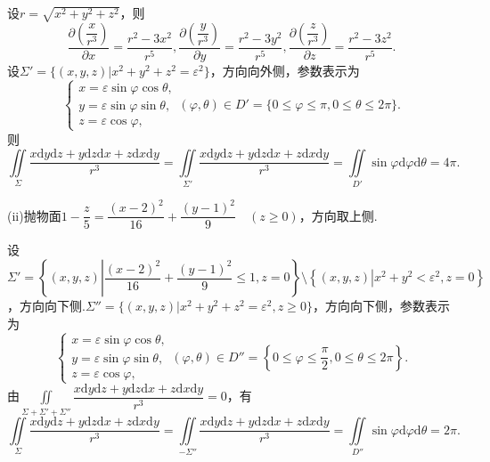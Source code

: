 \documentclass[12pt, a4paper]{article}
\newcommand{\dif}{\mathrm{d}}
\begin{document}
设\(r = \sqrt{x^2 + y^2 + z^2}\)，则
\[\frac{\partial\left(\dfrac{x}{r^3}\right)}{\partial x} = \frac{r^2 - 3x^2}{r^5}, \frac{\partial\left(\dfrac{y}{r^3}\right)}{\partial y} = \frac{r^2 - 3y^2}{r^5}, \frac{\partial\left(\dfrac{z}{r^3}\right)}{\partial z} = \frac{r^2 - 3z^2}{r^5}.\]
设\(\Sigma' = \{(x, y, z)|x^2 + y^2 + z^2 = \varepsilon^2\}\)，方向向外侧，参数表示为
\[\begin{cases}
x = \varepsilon\sin\varphi\cos\theta, \\
y = \varepsilon\sin\varphi\sin\theta, \\
z = \varepsilon\cos\varphi,
\end{cases} (\varphi, \theta) \in D' = \{0 \leq \varphi \leq \pi, 0 \leq \theta \leq 2\pi\}.\]
则
\[\iint\limits_{\Sigma} \frac{x \dif y \dif z + y \dif z \dif x + z \dif x \dif y}{r^3} = \iint\limits_{\Sigma'} \frac{x \dif y \dif z + y \dif z \dif x + z \dif x \dif y}{r^3} = \iint\limits_{D'} \sin\varphi \dif \varphi \dif \theta = 4\pi.\]

(ii)抛物面\(1 - \dfrac{z}{5} = \dfrac{(x - 2)^2}{16} + \dfrac{(y - 1)^2}{9} \quad (z \geq 0)\)，方向取上侧.

设\(\Sigma' = \left\{(x, y, z)\left|\dfrac{(x - 2)^2}{16} + \dfrac{(y - 1)^2}{9} \leq 1, z = 0\right.\right\} \setminus \left\{(x, y, z)\left|x^2 + y^2 < \varepsilon^2, z = 0\right.\right\}\)，方向向下侧.\(\Sigma'' = \{(x, y, z)|x^2 + y^2 + z^2 = \varepsilon^2, z \geq 0\}\)，方向向下侧，参数表示为
\[\begin{cases}
x = \varepsilon\sin\varphi\cos\theta, \\
y = \varepsilon\sin\varphi\sin\theta, \\
z = \varepsilon\cos\varphi,
\end{cases} (\varphi, \theta) \in D'' = \left\{0 \leq \varphi \leq \dfrac{\pi}{2}, 0 \leq \theta \leq 2\pi\right\}.\]
由\(\iint\limits_{\Sigma + \Sigma' + \Sigma''} \dfrac{x \dif y \dif z + y \dif z \dif x + z \dif x \dif y}{r^3} = 0\)，有
\[\iint\limits_\Sigma \dfrac{x \dif y \dif z + y \dif z \dif x + z \dif x \dif y}{r^3} = \iint\limits_{-\Sigma''} \dfrac{x \dif y \dif z + y \dif z \dif x + z \dif x \dif y}{r^3} = \iint\limits_{D''} \sin\varphi \dif \varphi \dif \theta = 2\pi.\]
\end{document}
